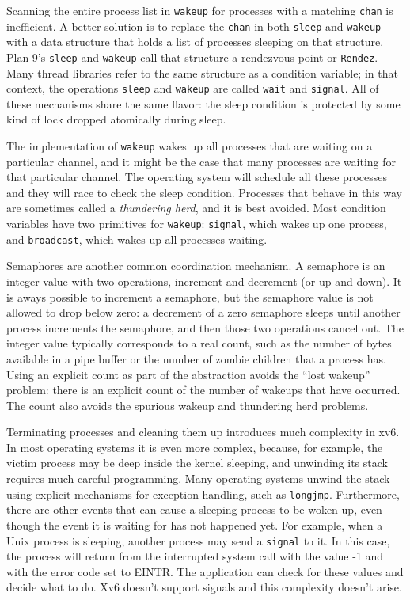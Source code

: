 Scanning the entire process list in
\lstinline{wakeup}
for processes with a matching
\lstinline{chan}
is inefficient.  A better solution is to
replace the
\lstinline{chan}
in both
\lstinline{sleep}
and
\lstinline{wakeup}
with a data structure that holds
a list of processes sleeping on that structure.
Plan 9's
\lstinline{sleep}
and
\lstinline{wakeup}
call that structure a rendezvous point or
\lstinline{Rendez}.
Many thread libraries refer to the same
structure as a condition variable;
in that context, the operations
\lstinline{sleep}
and
\lstinline{wakeup}
are called
\lstinline{wait}
and
\lstinline{signal}.
All of these mechanisms share the same
flavor: the sleep condition is protected by
some kind of lock dropped atomically during sleep.

The implementation of
\lstinline{wakeup}
wakes up all processes that are waiting on a particular channel, and it might be
the case that many processes are waiting for that particular channel.   The
operating system will schedule all these processes and they will race to check
the sleep condition.  Processes that behave in this way are sometimes called a
\textit{thundering herd},
and it is best avoided.
Most condition variables have two primitives for
\lstinline{wakeup}:
\lstinline{signal},
which wakes up one process, and
\lstinline{broadcast},
which wakes up all processes waiting.

Semaphores are another common coordination
mechanism.
A semaphore is an integer value with two operations,
increment and decrement (or up and down).
It is aways possible to increment a semaphore,
but the semaphore value is not allowed to drop below zero:
a decrement of a zero semaphore sleeps until
another process increments the semaphore,
and then those two operations cancel out.
The integer value typically corresponds to a real
count, such as the number of bytes available in a pipe buffer
or the number of zombie children that a process has.
Using an explicit count as part of the abstraction
avoids the ``lost wakeup'' problem:
there is an explicit count of the number
of wakeups that have occurred.
The count also avoids the spurious wakeup
and thundering herd problems.

Terminating processes and cleaning them up introduces much complexity in xv6.
In most operating systems it is even more complex, because, for example, the
victim process may be deep inside the kernel sleeping, and unwinding its
stack requires much careful programming.  Many operating systems unwind the stack
using explicit mechanisms for exception handling, such as
\lstinline{longjmp}.
Furthermore, there are other events that can cause a sleeping process to be
woken up, even though the event it is waiting for has not happened yet.  For
example, when a Unix process is sleeping, another process may send a 
\lstinline{signal}
to it.  In this case, the
process will return from the interrupted system call with the value -1 and with
the error code set to EINTR. The application can check for these values and
decide what to do.  Xv6 doesn't support signals and this complexity doesn't arise.

